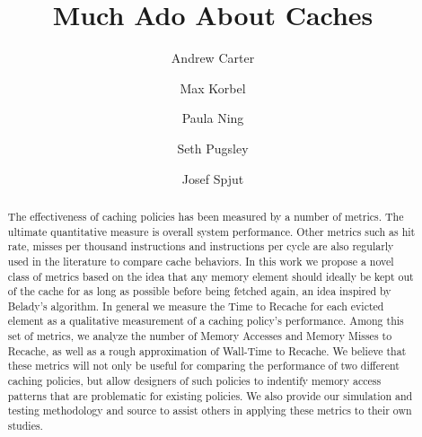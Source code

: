 \documentclass[conference]{IEEEtran}
\begin{document}
\title{Much Ado About Caches}


\author{Andrew Carter \and Max Korbel \and Paula Ning \and Seth Pugsley \and Josef Spjut}

\maketitle

\begin{abstract}
The effectiveness of caching policies has been measured by a number of metrics. 
The ultimate quantitative measure is overall system performance.
Other metrics such as hit rate, misses per thousand instructions and
instructions per cycle are also regularly used in the literature to
compare cache behaviors.
In this work we propose a novel class of metrics based on the idea
that any memory element should ideally be kept out of the cache
for as long as possible before being fetched again, an idea inspired
by Belady's algorithm.
In general we measure the Time to Recache for each evicted element as a qualitative measurement of a caching policy's performance.
Among this set of metrics, we analyze the number of Memory Accesses and Memory Misses to Recache, as well as a rough approximation
of Wall-Time to Recache.
We believe that these metrics will not only be useful for comparing the performance of two different caching policies,
  but allow designers of such policies to indentify memory access
  patterns that are problematic for existing policies.
We also provide our simulation and testing methodology and source to
assist others in applying these metrics to their own
studies.
\end{abstract}











\end{document}

